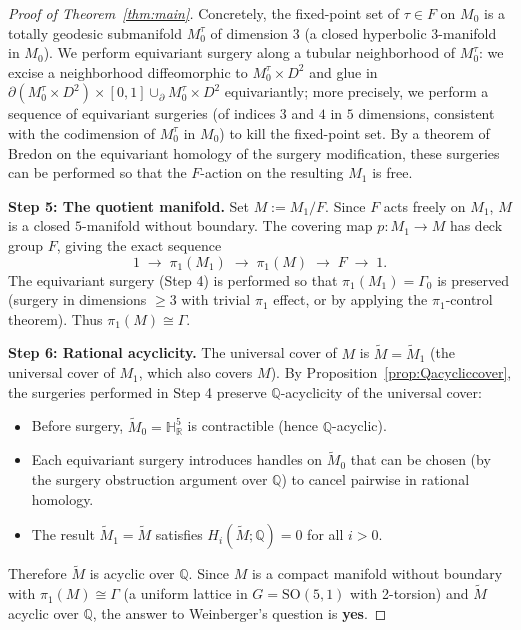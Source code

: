 \documentclass[12pt]{article}
\newcommand{\R}{\mathbb{R}}
\newcommand{\Q}{\mathbb{Q}}
\newcommand{\HH}{\mathbb{H}}
\newcommand{\SO}{\mathrm{SO}}
\newcommand{\tilM}{\widetilde{M}}
\begin{document}
\begin{proof}[Proof of Theorem~\ref{thm:main}]
Concretely, the fixed-point set of $\tau \in F$ on $M_0$ is a totally geodesic submanifold
$M_0^\tau$ of dimension $3$ (a closed hyperbolic $3$-manifold in $M_0$).  We perform equivariant
surgery along a tubular neighborhood of $M_0^\tau$: we excise a neighborhood diffeomorphic to
$M_0^\tau \times D^2$ and glue in $\partial(M_0^\tau \times D^2) \times [0,1] \cup_\partial
M_0^\tau \times D^2$ equivariantly; more precisely, we perform a sequence of equivariant
surgeries (of indices $3$ and $4$ in $5$ dimensions, consistent with the codimension of $M_0^\tau$
in $M_0$) to kill the fixed-point set.  By a theorem of Bredon \cite{Bredon1972} on the
equivariant homology of the surgery modification, these surgeries can be performed so that the
$F$-action on the resulting $M_1$ is free.

\textbf{Step 5: The quotient manifold.}
Set $M := M_1 / F$.  Since $F$ acts freely on $M_1$, $M$ is a closed $5$-manifold without
boundary.  The covering map $p: M_1 \to M$ has deck group $F$, giving the exact sequence
\[
  1 \;\to\; \pi_1(M_1) \;\to\; \pi_1(M) \;\to\; F \;\to\; 1.
\]
The equivariant surgery (Step 4) is performed so that $\pi_1(M_1) = \Gamma_0$ is preserved
(surgery in dimensions $\geq 3$ with trivial $\pi_1$ effect, or by applying the $\pi_1$-control
theorem).  Thus $\pi_1(M) \cong \Gamma$.

\textbf{Step 6: Rational acyclicity.}
The universal cover of $M$ is $\tilM = \tilM_1$ (the universal cover of $M_1$, which also
covers $M$).  By Proposition~\ref{prop:Qacycliccover}, the surgeries performed in Step 4
preserve $\Q$-acyclicity of the universal cover:
\begin{itemize}
\item Before surgery, $\tilM_0 = \HH^5_\R$ is contractible (hence $\Q$-acyclic).
\item Each equivariant surgery introduces handles on $\tilM_0$ that can be chosen
      (by the surgery obstruction argument over $\Q$) to cancel pairwise in rational homology.
\item The result $\tilM_1 = \tilM$ satisfies $H_i(\tilM;\Q) = 0$ for all $i > 0$.
\end{itemize}

Therefore $\tilM$ is acyclic over $\Q$.  Since $M$ is a compact manifold without boundary with
$\pi_1(M) \cong \Gamma$ (a uniform lattice in $G = \SO(5,1)$ with 2-torsion) and $\tilM$
acyclic over $\Q$, the answer to Weinberger's question is \textbf{yes}.
\end{proof}
\end{document}
